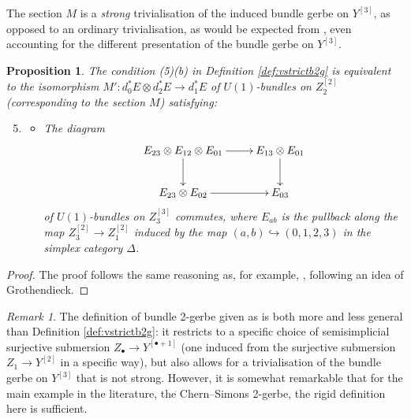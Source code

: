 \documentclass[12pt]{amsart}
\theoremstyle{plain}
\newtheorem{proposition}[theorem]{Proposition}
\theoremstyle{definition}
\theoremstyle{remark}
\newtheorem{remark}[theorem]{Remark}
\numberwithin{equation}{section}
\newcommand{\<}{\langle}
\renewcommand{\>}{\rangle}
\def\into {\hookrightarrow}
\begin{document}
The section $M$ is a \emph{strong} trivialisation of the induced bundle gerbe on $Y^{[3]}$, as opposed to an ordinary trivialisation, as would be expected from \cite[\S 7.1]{StevPhD}, even accounting for the different presentation of the bundle gerbe on $Y^{[3]}$.

\begin{proposition}\label{prop:rb2g_mult_associativity_square}
The condition (5)(b) in Definition \ref{def:vstrictb2g} is equivalent to the isomorphism $M'\colon d_0^* E\otimes d_2^*E \to d_1^* E$ of $U(1)$-bundles on $Z_2^{[2]}$ (corresponding to the section $M$) satisfying:
\begin{enumerate}
\setcounter{enumi}{4}
\item \begin{itemize}
\item[(b')] The diagram
\[
  \xymatrix{
    E_{23}\otimes E_{12} \otimes E_{01} \ar[r] \ar[d] & E_{13} \otimes E_{01} \ar[d] \\
    E_{23} \otimes E_{02}\ar[r] & E_{03}
  }
\]
of $U(1)$-bundles on $Z_3^{[3]}$ commutes, where $E_{ab}$ is the pullback along the map $Z_3^{[2]} \to Z_1^{[2]}$ induced by the map $(a,b)\into (0,1,2,3)$ in the simplex category $\Delta$.
 \end{itemize}
\end{enumerate}
\end{proposition}

\begin{proof}
The proof follows the same reasoning as, for example, \cite[Theorem 5.2]{BM}, following an idea of Grothendieck.
\end{proof}

\begin{remark}\label{rem:compare_to_MRSV}
The definition of bundle 2-gerbe given as \cite[Definition 6.5]{MRSV} is both more and less general than Definition \ref{def:vstrictb2g}: it restricts to a specific choice of semisimplicial surjective submersion $Z_\bullet \to Y^{[\bullet+1]}$ (one induced from the surjective submersion $Z_1\to Y^{[2]}$ in a specific way), but also allows for a trivialisation of the bundle gerbe on $Y^{[3]}$ that is not strong.
However, it is somewhat remarkable that for the main example in the literature, the Chern--Simons 2-gerbe, the rigid definition here is sufficient.
\end{remark}
\end{document}
